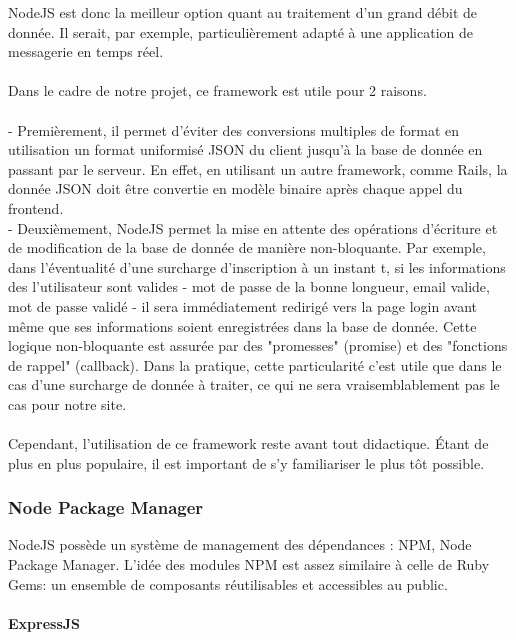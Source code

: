 \documentclass[oneside,a4paper,13pt]{article}
\begin{document}
NodeJS est donc la meilleur option quant au traitement d'un grand débit de donnée. Il serait, par exemple, particulièrement adapté à une application de messagerie en temps réel. \\ \\
Dans le cadre de notre projet, ce framework est utile pour 2 raisons. \\ \\
- Premièrement, il permet d'éviter des conversions multiples de format en utilisation un format uniformisé JSON du client jusqu'à la base de donnée en passant par le serveur. En effet, en utilisant un autre framework, comme Rails, la donnée JSON doit être convertie en modèle binaire après chaque appel du frontend.\\
- Deuxièmement, NodeJS permet la mise en attente des opérations d'écriture et de modification de la base de donnée de manière non-bloquante. Par exemple, dans l'éventualité d'une surcharge d'inscription à un instant t, si les informations des l'utilisateur sont valides - mot de passe de la bonne longueur, email valide, mot de passe validé - il sera immédiatement redirigé vers la page login avant même que ses informations soient enregistrées dans la base de donnée. Cette logique non-bloquante est 
assurée par des "promesses" (promise) et des "fonctions de rappel" (callback). Dans la pratique, cette particularité c'est utile que dans le cas d'une surcharge de donnée à traiter, ce qui ne sera vraisemblablement pas le cas pour notre site. \\ \\

Cependant, l'utilisation de ce framework reste avant tout didactique. Étant de plus en plus populaire, il est important de s'y familiariser le plus tôt possible.

\subsubsection{Node Package Manager}

NodeJS possède un système de management des dépendances : NPM, Node Package Manager. L'idée des modules NPM est assez similaire à celle de Ruby Gems: un ensemble de composants réutilisables et accessibles au public. 

\paragraph{ExpressJS}
\end{document}
